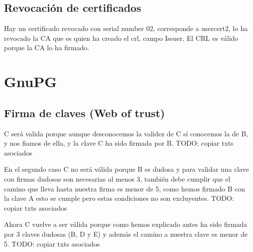 \documentclass[11pt]{article}
\begin{document}
    \subsection{Revocación de certificados}
      \par
      Hay un certificado revocado con serial number 02, corresponde a usercert2, lo ha revocado la CA que
      es quien ha creado el crl, campo Issuer. El CRL es válido porque la CA lo ha firmado.

  \section{GnuPG}
    \subsection{Firma de claves (Web of trust)}
      \par
      C será valida porque aunque desconocemos la validez de C sí conocemos la de B, y nos
      fiamos de ella, y la clave C ha sido firmada por B.
      TODO: copiar txts asociados

      \bigskip
      \par
      En el segundo caso C no será válida porque B es dudosa y para validar una clave con firmas
      dudosas son necesarias al menos 3, también debe cumplir que el camino que lleva hasta nuestra
      firma es menor de 5, como hemos firmado B con la clave A esto se cumple pero estas condiciones
      no son excluyentes.
      TODO: copiar txts asociados

      \bigskip
      \par
      Ahora C vuelve a ser válida porque como hemos explicado antes ha sido firmada por 3 claves
      dudosas (B, D y E) y además el camino a nuestra clave es menor de 5.
      TODO: copiar txts asociados
    
\end{document}
